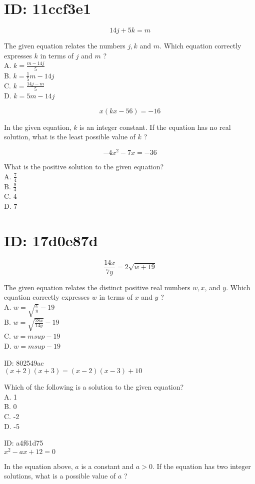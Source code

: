 

\section*{ID: 11ccf3e1}
$$
14 j+5 k=m
$$

The given equation relates the numbers $j, k$ and $m$. Which equation correctly expresses $k$ in terms of $j$ and $m$ ?\\
A. $k=\frac{m-14 j}{5}$\\
B. $k=\frac{1}{5} m-14 j$\\
C. $k=\frac{14 j-m}{5}$\\
D. $k=5 m-14 j$

$$
x(k x-56)=-16
$$

In the given equation, $k$ is an integer constant. If the equation has no real solution, what is the least possible value of $k$ ?

$$
-4 x^{2}-7 x=-36
$$

What is the positive solution to the given equation?\\
A. $\frac{7}{4}$\\
B. $\frac{9}{4}$\\
C. 4\\
D. 7

\section*{ID: 17d0e87d}
$$
\frac{14 x}{7 y}=2 \sqrt{w+19}
$$

The given equation relates the distinct positive real numbers $w, x$, and $y$. Which equation correctly expresses $w$ in terms of $x$ and $y$ ?\\
A. $w=\sqrt{\frac{x}{y}}-19$\\
B. $w=\sqrt{\frac{28 x}{14 y}}-19$\\
C. $w=m s u p-19$\\
D. $w=m s u p-19$

ID: 802549ac\\
$(x+2)(x+3)=(x-2)(x-3)+10$

Which of the following is a solution to the given equation?\\
A. 1\\
B. 0\\
C. -2\\
D. -5

ID: a4f61d75\\
$x^{2}-a x+12=0$

In the equation above, $a$ is a constant and $a>0$. If the equation has two integer solutions, what is a possible value of $a$ ?

